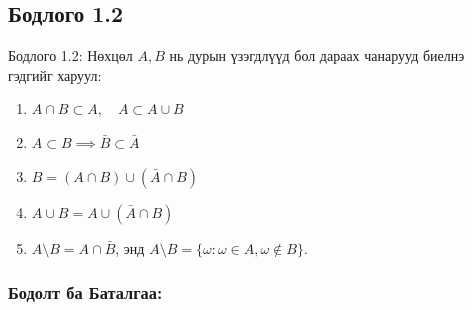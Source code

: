 \documentclass[11pt,a4paper]{article}
\begin{document}
\vspace{0.8em}

\subsection*{Бодлого 1.2}

\begin{problembox}{Бодлого 1.2: Нөхцөл}
$A, B$ нь дурын үзэгдлүүд бол дараах чанарууд биелнэ гэдгийг харуул:
\begin{enumerate}[label=\textbf{\alph*)}, leftmargin=1.8em, itemsep=1pt]
  \item $A \cap B \subset A, \quad A \subset A \cup B$
  \item $A \subset B \implies \bar{B} \subset \bar{A}$
  \item $B = (A \cap B) \cup (\bar{A} \cap B)$
  \item $A \cup B = A \cup (\bar{A} \cap B)$
  \item $A \setminus B = A \cap \bar{B}$, энд $A \setminus B = \{\omega : \omega \in A, \omega \notin B\}$.
\end{enumerate}
\end{problembox}

\subsubsection*{Бодолт ба Баталгаа:}
\end{document}

